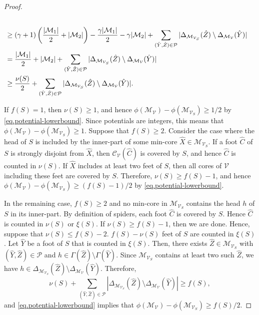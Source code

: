 \documentclass[11pt]{article}
\newcommand{\Mfam}{\mathcal{M}}
\newcommand{\Cfam}{\mathcal{C}}
\newcommand{\Vfam}{\mathcal{V}}
\newcommand{\Pfam}{\mathcal{P}}
\begin{document}
\begin{proof}
\begin{align}
\notag \\
 &\geq 
 (\gamma+1)\left(\frac{|\Mfam_1|}{2}+|\Mfam_2|\right) - \frac{\gamma|\Mfam_1|}{2} - \gamma|\Mfam_2| + 
  \sum_{(\hat{Y},\hat{Z}) \in \Pfam} |\Delta_{\Mfam_{\Vfam_S}}(\hat{Z})\setminus \Delta_{\Mfam_{\Vfam}}(\hat{Y})|
\notag\\
&=\frac{|\Mfam_1|}{2} + |\Mfam_2| + 
  \sum_{(\hat{Y},\hat{Z}) \in \Pfam} |\Delta_{\Mfam_{\Vfam_S}}(\hat{Z})\setminus \Delta_{\Mfam_{\Vfam}}(\hat{Y})|\notag\\
&\geq  \frac{\nu(S)}{2} + 
  \sum_{(\hat{Y},\hat{Z}) \in \Pfam} |\Delta_{\Mfam_{\Vfam_S}}(\hat{Z})\setminus \Delta_{\Mfam_{\Vfam}}(\hat{Y})|.\label{eq.potential-lowerbound}
\end{align}


 If $f(S)=1$, then $\nu(S) \geq 1$, and hence $\phi(\Mfam_{\Vfam})-\phi(\Mfam_{\Vfam_S})
 \geq 1/2$ by \eqref{eq.potential-lowerbound}. Since potentials are integers, this means that 
 $\phi(\Mfam_{\Vfam})-\phi(\Mfam_{\Vfam_S}) \geq 1$.
 Suppose that $f(S) \geq 2$. 
  Consider the case where the head of $S$ is included by the inner-part
 of some min-core $\hat{X} \in \Mfam_{\Vfam_S}$.
 If a foot $\hat{C}$ of $S$ is strongly disjoint from $\hat{X}$, 
 then $\Cfam_{\Vfam}(\hat{C})$ is covered by $S$, and hence $\hat{C}$ is counted in $\nu(S)$.
 If $\hat{X}$ includes at least two feet of $S$, then all cores of $\Vfam$
 including these feet are covered by $S$. Therefore,
 $\nu(S) \geq f(S)-1$, and hence
 $\phi(\Mfam_{\Vfam})-\phi(\Mfam_{\Vfam_S})\geq (f(S)-1)/2$ by \eqref{eq.potential-lowerbound}.

 In the remaining case, $f(S) \geq 2$ and 
 no min-core in $\Mfam_{\Vfam_S}$ contains
the head $h$ of $S$ in its inner-part.
By definition of spiders, each foot $\hat{C}$ is covered by $S$.
 Hence $\hat{C}$ is counted in $\nu(S)$ or $\xi(S)$.
 If $\nu(S) \geq f(S)-1$, then we are done. Hence, suppose that
 $\nu(S)\leq f(S)-2$. $f(S)-\nu(S)$ feet of $S$ are counted in $\xi(S)$.
 Let $\hat{Y}$ be a foot of $S$ that is counted in $\xi(S)$.
 Then, there exists $\hat{Z} \in \Mfam_{\Vfam_S}$ with
 $(\hat{Y},\hat{Z})\in \Pfam$ and $h \in \Gamma(\hat{Z}) \setminus
 \Gamma(\hat{Y})$.
 Since $\Mfam_{\Vfam_S}$ contains at least two such $\hat{Z}$,
 we have $h \in \Delta_{\Mfam_{\Vfam_S}}(\hat{Z}) \setminus
 \Delta_{\Mfam_{\Vfam}}(\hat{Y})$.
 Therefore,
\[
 \nu(S) + 
  \sum_{(\hat{Y},\hat{Z}) \in \Pfam} 
 |\Delta_{\Mfam_{\Vfam_S}}(\hat{Z})\setminus \Delta_{\Mfam_{\Vfam}}(\hat{Y})|
 \geq f(S),
\]
 and \eqref{eq.potential-lowerbound} implies that
 $\phi(\Mfam_{\Vfam})-\phi(\Mfam_{\Vfam_S}) \geq f(S)/2$.
 \end{proof}
\end{document}
